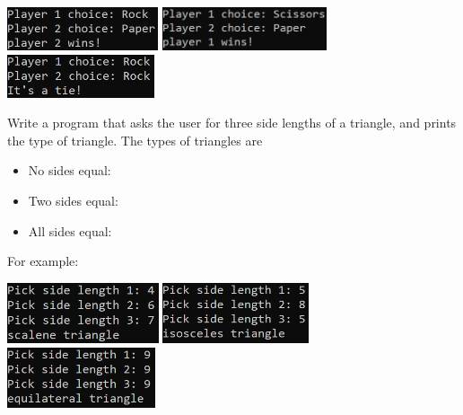 		\hfill 
		\includegraphics[height = 0.5in]{./imgs/RockPaperScissors1.PNG} \hfill 
		\includegraphics[height = 0.5in]{./imgs/RockPaperScissors2.PNG} \hfill  
		\includegraphics[height = 0.5in]{./imgs/RockPaperScissors3.PNG} \hfill \ 


	\item  
		Write a program that asks the user for three side lengths of a triangle, and prints 
		the type of triangle.  The types of triangles are 
		\begin{itemize}
			\item No sides equal: 
			\item Two sides equal: 
			\item All sides equal: 	
		\end{itemize}
		For example:

		\hfill 
		\includegraphics[height = 0.7in]{./imgs/typeOfTriangle1.PNG} \hfill 
		\includegraphics[height = 0.7in]{./imgs/typeOfTriangle2.PNG} \hfill  
		\includegraphics[height = 0.7in]{./imgs/typeOfTriangle3.PNG} \hfill \ 












